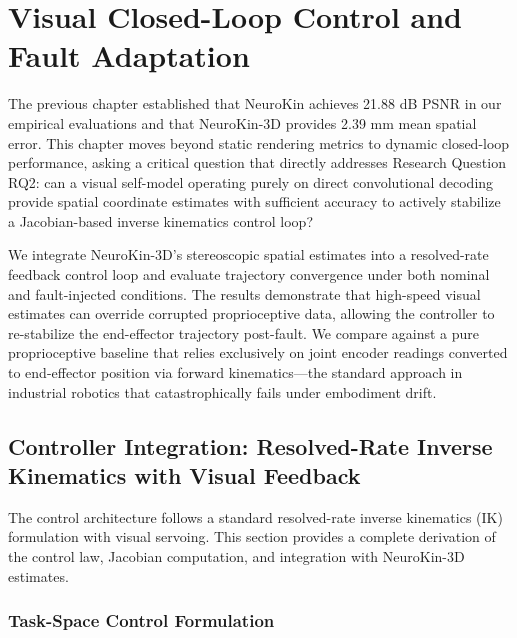 \documentclass[12pt,a4paper,oneside]{report}
\begin{document}
\chapter{Visual Closed-Loop Control and Fault Adaptation}
\label{chap:closed_loop_fault_adaptation}

The previous chapter established that NeuroKin achieves 21.88 dB PSNR in our empirical evaluations and that NeuroKin-3D provides 2.39 mm mean spatial error. This chapter moves beyond static rendering metrics to dynamic closed-loop performance, asking a critical question that directly addresses Research Question RQ2: can a visual self-model operating purely on direct convolutional decoding provide spatial coordinate estimates with sufficient accuracy to actively stabilize a Jacobian-based inverse kinematics control loop?

We integrate NeuroKin-3D's stereoscopic spatial estimates into a resolved-rate feedback control loop and evaluate trajectory convergence under both nominal and fault-injected conditions. The results demonstrate that high-speed visual estimates can override corrupted proprioceptive data, allowing the controller to re-stabilize the end-effector trajectory post-fault. We compare against a pure proprioceptive baseline that relies exclusively on joint encoder readings converted to end-effector position via forward kinematics—the standard approach in industrial robotics that catastrophically fails under embodiment drift.

\section{Controller Integration: Resolved-Rate Inverse Kinematics with Visual Feedback}

The control architecture follows a standard resolved-rate inverse kinematics (IK) formulation with visual servoing. This section provides a complete derivation of the control law, Jacobian computation, and integration with NeuroKin-3D estimates.

\subsection{Task-Space Control Formulation}
\label{subsec:task_space_control_formulation}
\end{document}

